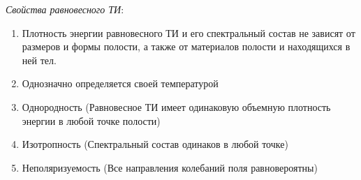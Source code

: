 \textit{Свойства равновесного ТИ}:
\begin{enumerate}
\item
Плотность энергии равновесного ТИ и его спектральный состав не зависят от размеров и формы полости, а также от материалов полости и находящихся в ней тел.
\item
Однозначно определяется своей температурой
\item
Однородность (Равновесное ТИ имеет одинаковую объемную плотность энергии в любой точке полости)
\item
Изотропность (Спектральный состав одинаков в любой точке)
\item
Неполяризуемость (Все направления колебаний поля равновероятны)
\end{enumerate}

